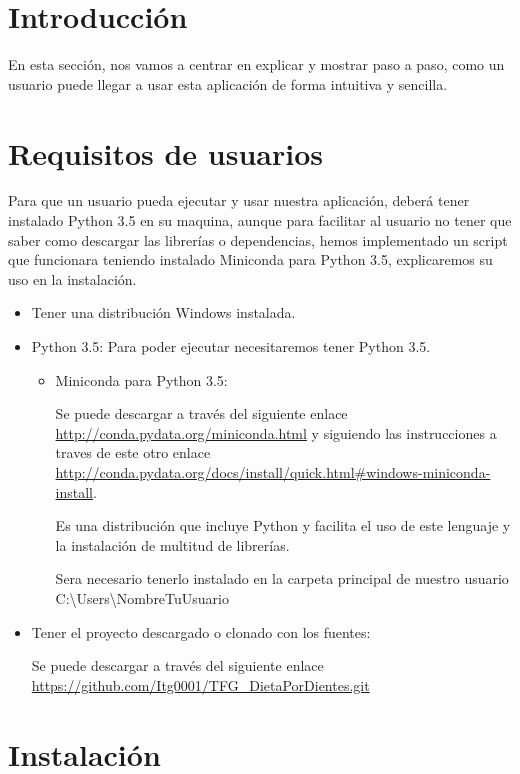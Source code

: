 
\section{Introducción}
En esta sección, nos vamos a centrar en explicar y mostrar paso a paso, como un usuario puede llegar a usar esta aplicación de forma intuitiva y sencilla.
\section{Requisitos de usuarios}
Para que un usuario pueda ejecutar y usar nuestra aplicación, deberá tener instalado Python 3.5 en su maquina, aunque para facilitar al usuario no tener que saber como descargar las librerías o dependencias, hemos implementado un script que funcionara teniendo instalado Miniconda para Python 3.5, explicaremos su uso en la instalación.

\begin{itemize}
	\item Tener una distribución Windows instalada.

	\item Python 3.5: Para poder ejecutar necesitaremos tener Python 3.5.
	\begin{itemize}
		\item Miniconda para Python 3.5:
		
		Se puede descargar a través del siguiente enlace \url{http://conda.pydata.org/miniconda.html} y siguiendo las instrucciones a traves de este otro enlace \url{http://conda.pydata.org/docs/install/quick.html#windows-miniconda-install}.		
		
		Es una distribución que incluye Python y facilita el uso de este lenguaje y la instalación de multitud de librerías.
		
		Sera necesario tenerlo instalado en la carpeta principal de nuestro usuario C:\textbackslash Users\textbackslash NombreTuUsuario
	\end{itemize}
	
	\item Tener el proyecto descargado o clonado con los fuentes:
	
	Se puede descargar a través del siguiente enlace \url{https://github.com/Itg0001/TFG_DietaPorDientes.git}

\end{itemize}

\section{Instalación}

